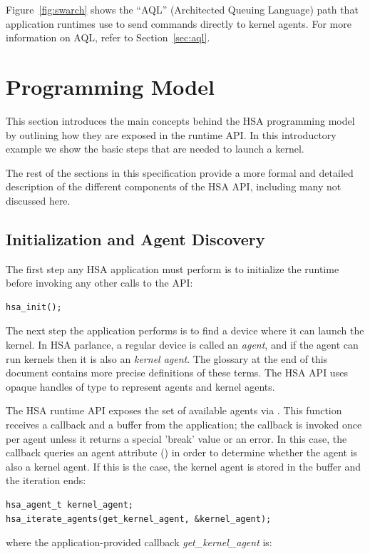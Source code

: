 \documentclass[oneside]{book}
\begin{document}
Figure~\ref{fig:swarch} shows the ``AQL'' (Architected Queuing
Language) path that application runtimes use to send commands directly to
kernel agents. For more information on AQL, refer to Section~\ref{sec:aql}.


\section{Programming Model}\label{sec:executionmodel}

This section introduces the main concepts behind the HSA programming model by
outlining how they are exposed in the runtime API. In this introductory example
we show the basic steps that are needed to launch a kernel.

The rest of the sections in this specification provide a more formal and
detailed description of the different components of the HSA API, including many
not discussed here.

\subsection{Initialization and Agent Discovery}
The first step any HSA application must perform is to initialize the runtime
before invoking any other calls to the API:
\begin{lstlisting}
hsa_init();
\end{lstlisting}
The next step the application performs is to find a device where it can launch
the kernel. In HSA parlance, a regular device is called an \emph{agent}, and
if the agent can run kernels then it is also an \emph{kernel agent}. The
glossary at the end of this document contains more precise definitions of these
terms. The HSA API uses opaque handles of type  to represent
agents and kernel agents.

The HSA runtime API exposes the set of available agents via
. This function receives a callback and a buffer from
the application; the callback is invoked once per agent unless it returns a
special 'break' value or an error. In this case, the callback queries an
agent attribute () in order to determine whether
the agent is also a kernel agent. If this is the case, the kernel agent
is stored in the buffer and the iteration ends:

\begin{lstlisting}
hsa_agent_t kernel_agent;
hsa_iterate_agents(get_kernel_agent, &kernel_agent);
\end{lstlisting}
where the application-provided callback \textit{get_kernel_agent} is:
\end{document}
